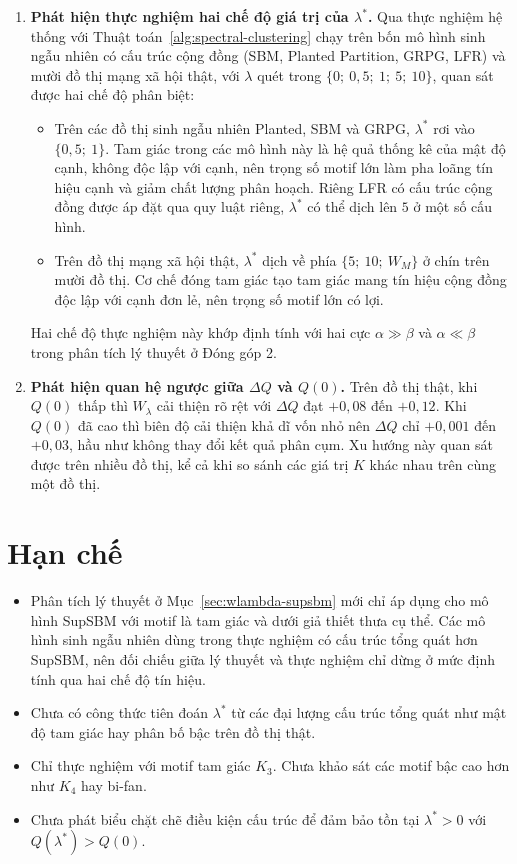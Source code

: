 \begin{enumerate}
    \item \textbf{Phát hiện thực nghiệm hai chế độ giá trị của $\lambda^*$.} Qua thực nghiệm hệ thống với Thuật toán~\ref{alg:spectral-clustering} chạy trên bốn mô hình sinh ngẫu nhiên có cấu trúc cộng đồng (SBM, Planted Partition, GRPG, LFR) và mười đồ thị mạng xã hội thật, với $\lambda$ quét trong $\{0;\ 0{,}5;\ 1;\ 5;\ 10\}$, quan sát được hai chế độ phân biệt:
    \begin{itemize}
        \item Trên các đồ thị sinh ngẫu nhiên Planted, SBM và GRPG, $\lambda^*$ rơi vào $\{0{,}5;\ 1\}$. Tam giác trong các mô hình này là hệ quả thống kê của mật độ cạnh, không độc lập với cạnh, nên trọng số motif lớn làm pha loãng tín hiệu cạnh và giảm chất lượng phân hoạch. Riêng LFR có cấu trúc cộng đồng được áp đặt qua quy luật riêng, $\lambda^*$ có thể dịch lên $5$ ở một số cấu hình.
        \item Trên đồ thị mạng xã hội thật, $\lambda^*$ dịch về phía $\{5;\ 10;\ W_M\}$ ở chín trên mười đồ thị. Cơ chế đóng tam giác tạo tam giác mang tín hiệu cộng đồng độc lập với cạnh đơn lẻ, nên trọng số motif lớn có lợi.
    \end{itemize}
    Hai chế độ thực nghiệm này khớp định tính với hai cực $\alpha \gg \beta$ và $\alpha \ll \beta$ trong phân tích lý thuyết ở Đóng góp 2.

    \item \textbf{Phát hiện quan hệ ngược giữa $\Delta Q$ và $Q(0)$.} Trên đồ thị thật, khi $Q(0)$ thấp thì $W_\lambda$ cải thiện rõ rệt với $\Delta Q$ đạt $+0{,}08$ đến $+0{,}12$. Khi $Q(0)$ đã cao thì biên độ cải thiện khả dĩ vốn nhỏ nên $\Delta Q$ chỉ $+0{,}001$ đến $+0{,}03$, hầu như không thay đổi kết quả phân cụm. Xu hướng này quan sát được trên nhiều đồ thị, kể cả khi so sánh các giá trị $K$ khác nhau trên cùng một đồ thị.
\end{enumerate}

\section*{Hạn chế}

\begin{itemize}
    \item Phân tích lý thuyết ở Mục~\ref{sec:wlambda-supsbm} mới chỉ áp dụng cho mô hình SupSBM với motif là tam giác và dưới giả thiết thưa cụ thể. Các mô hình sinh ngẫu nhiên dùng trong thực nghiệm có cấu trúc tổng quát hơn SupSBM, nên đối chiếu giữa lý thuyết và thực nghiệm chỉ dừng ở mức định tính qua hai chế độ tín hiệu.
    \item Chưa có công thức tiên đoán $\lambda^*$ từ các đại lượng cấu trúc tổng quát như mật độ tam giác hay phân bố bậc trên đồ thị thật.
    \item Chỉ thực nghiệm với motif tam giác $K_3$. Chưa khảo sát các motif bậc cao hơn như $K_4$ hay bi-fan.
    \item Chưa phát biểu chặt chẽ điều kiện cấu trúc để đảm bảo tồn tại $\lambda^* > 0$ với $Q(\lambda^*) > Q(0)$.
\end{itemize}

